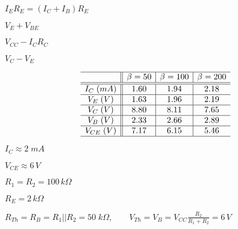 \documentclass{article}
\def\lthtmlcheckvsize{\ifdim\ht\sizebox<\vsize 
  \ifdim\wd\sizebox<\hsize\expandafter\hfill\fi \expandafter\vfill
  \else\expandafter\vss\fi}%
\begin{document}
{\newpage\clearpage
{}%
$\displaystyle I_E R_E=(I_C+I_B)R_E$%
\lthtmlindisplaymathZ
\lthtmlcheckvsize\clearpage}

{\newpage\clearpage
{}%
$\displaystyle V_E+V_{BE}$%
\lthtmlindisplaymathZ
\lthtmlcheckvsize\clearpage}

{\newpage\clearpage
{}%
$\displaystyle V_{CC}-I_CR_C$%
\lthtmlindisplaymathZ
\lthtmlcheckvsize\clearpage}

{\newpage\clearpage
{}%
$\displaystyle V_C-V_E$%
\lthtmlindisplaymathZ
\lthtmlcheckvsize\clearpage}

{\newpage\clearpage
{}%
\begin{displaymath}\begin{array}{c||c|c|c}\hline
& \beta=50  & \beta=100 & \beta=200 \\\hline\hline
I_C\;(mA)  & 1.60 & 1.94     & 2.18      \\\hline
V_E\;(V)   & 1.63 & 1.96     & 2.19      \\\hline
V_C\;(V)   & 8.80 & 8.11     & 7.65      \\\hline
V_B\;(V)   & 2.33 & 2.66     & 2.89      \\\hline
V_{CE}\;(V) & 7.17 & 6.15     & 5.46      \\\hline
\end{array}\end{displaymath}%
\lthtmldisplayZ
\lthtmlcheckvsize\clearpage}

{\newpage\clearpage
{}%
$ I_C\approx 2\;mA$%
\lthtmlindisplaymathZ
\lthtmlcheckvsize\clearpage}

{\newpage\clearpage
{}%
$ V_{CE}\approx 6\,V$%
\lthtmlindisplaymathZ
\lthtmlcheckvsize\clearpage}

{\newpage\clearpage
{}%
$ R_1=R_2=100\,k\Omega$%
\lthtmlindisplaymathZ
\lthtmlcheckvsize\clearpage}

{\newpage\clearpage
{}%
$ R_E=2\,k\Omega$%
\lthtmlindisplaymathZ
\lthtmlcheckvsize\clearpage}

{\newpage\clearpage
{}%
$\displaystyle R_{Th}=R_B=R_1||R_2=50\;k\Omega,\;\;\;\;\;\;\;
V_{Th}=V_B=V_{CC}\frac{R_2}{R_1+R_2}=6\,V$%
\lthtmlindisplaymathZ
\lthtmlcheckvsize\clearpage}
\end{document}
